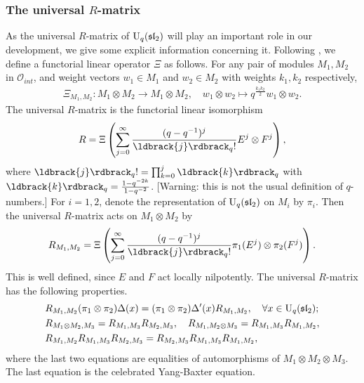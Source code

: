 \documentclass[12pt]{amsart}
\theoremstyle{definition}
\theoremstyle{remark}
\numberwithin{equation}{section}
\newcommand{\CO}{{\mathcal O}}
\newcommand{\U}{{\rm{U}}}
\newcommand{\fsl}{{\mathfrak {sl}}}
\newcommand{\qint}[1]{\ldbrack{#1}\rdbrack_q }
\begin{document}
\subsubsection{The universal $R$-matrix}
%
%
As the universal $R$-matrix of $\U_q(\fsl_2)$ will play an important role in our development, we give some explicit
information concerning it.  Following  \cite{LZ06}, we 
 define a functorial linear operator $\Xi$ as follows.  For any pair of modules $M_1, M_2$ in $\CO_{int}$,  and weight vectors 
$w_1\in M_1$ and $w_2\in M_2$ with weights $k_1, k_2$ respectively,
\begin{eqnarray}
\Xi_{M_1, M_2}: M_1\otimes M_2 \longrightarrow M_1\otimes M_2, \quad w_1\otimes w_2 \mapsto q^{\frac{k_1 k_2}{2}} w_1\otimes w_2.
\end{eqnarray}
The universal $R$-matrix is the functorial linear isomorphism
\begin{eqnarray}\label{eq:univ-R}
R = \Xi \left(\sum_{j=0}^\infty \frac{(q-q^{-1})^j}{\qint{j}!} E^j\otimes F^j\right),
\end{eqnarray}
where $\qint{j}!=\prod_{k=0}^j\qint{k}$ with $\qint{k}=\frac{1-q^{-2k}}{1-q^{-2}}$. [Warning: this is not the usual definition of $q$-numbers.]
For $i=1,2$, denote the representation of $\U_q(\fsl_2)$ on $M_i$ by $\pi_i$. 
Then the universal $R$-matrix acts on $M_1\otimes M_2$ by 
\[
R_{M_1, M_2} = \Xi \left(\sum_{j=0}^\infty \frac{(q-q^{-1})^j}{\qint{j}!} \pi_1(E^j)\otimes \pi_2(F^j)\right).
\]
This is well defined, since $E$ and $F$ act locally nilpotently.  The universal $R$-matrix has the following properties. 
\begin{eqnarray}
&R_{M_1, M_2}  (\pi_1\otimes \pi_2)\Delta(x) =  (\pi_1\otimes \pi_2)\Delta'(x)R_{M_1, M_2}, \quad \forall x\in \U_q(\fsl_2);  \\
&R_{M_1\otimes M_2, M_3} = R_{M_1, M_3} R_{M_2, M_3}, \quad 
R_{M_1, M_2\otimes M_3} = R_{M_1, M_3} R_{M_1, M_2}, \\
&R_{M_1, M_2} R_{M_1, M_3} R_{M_2, M_3} =R_{M_2, M_3}R_{M_1, M_3} R_{M_1, M_2}, 
\end{eqnarray}
where the last two equations are equalities of automorphisms of $M_1\otimes M_2\otimes M_3$. 
The last equation is the celebrated Yang-Baxter equation. 
\end{document}
